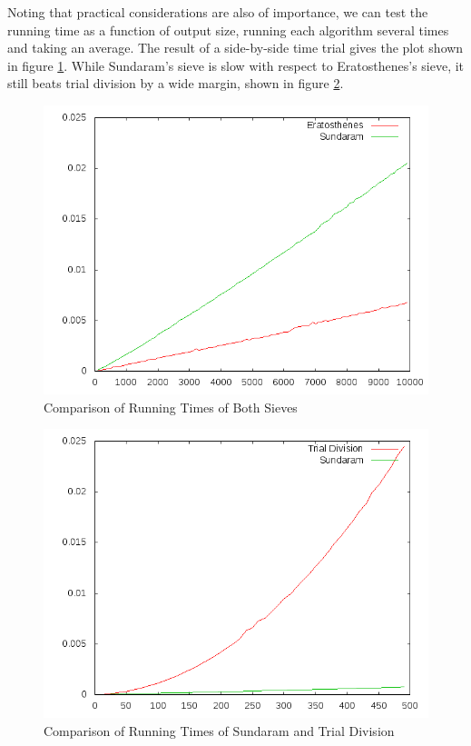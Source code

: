 \documentclass{amsart}
\theoremstyle{definition}
\theoremstyle{case}
\begin{document}
	Noting that practical considerations are also of importance, we can test the running time as a function of output size, running each algorithm several times and taking an average. The result of a side-by-side time trial gives the plot shown in figure \ref{runtimevs}. While Sundaram's sieve is slow with respect to Eratosthenes's sieve, it still beats trial division by a wide margin, shown in figure \ref{runtimetds}.
	
	\begin{figure}\caption{Comparison of Running Times of Both Sieves}
		\label{runtimevs}
		\includegraphics[scale=0.5]{both1.png}
	\end{figure}
	
	\begin{figure}\caption{Comparison of Running Times of Sundaram and Trial Division}
		\label{runtimetds}
		\includegraphics[scale=0.5]{sundiv.png}
	\end{figure}
	
\end{document}
